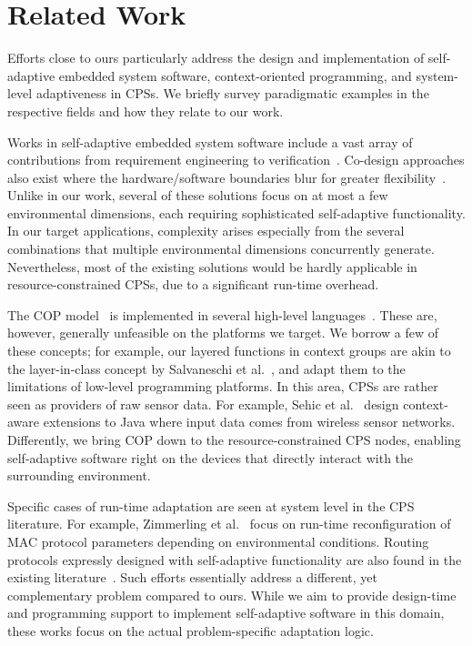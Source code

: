 \section{Related Work}
\label{sec:related}

Efforts close to ours particularly address the design and
implementation of self-adaptive embedded system software,
context-oriented programming, and system-level adaptiveness in
CPSs. We briefly survey paradigmatic examples in the respective fields
and how they relate to our work.

Works in self-adaptive embedded system software
include a vast array of contributions from requirement engineering to
verification~\cite{cheng:adaptive}. Co-design approaches also exist
where the hardware/software boundaries blur for greater
flexibility~\cite{diguet11:closed}. Unlike in our work, several of
these solutions focus on at most a few environmental dimensions, each
requiring sophisticated self-adaptive functionality. In our target
applications, complexity arises especially from the several
combinations that multiple environmental dimensions concurrently
generate. Nevertheless, most of the existing solutions would be hardly
applicable in resource-constrained CPSs, due to a significant
run-time overhead.

The COP model~\cite{Hirschfeld08} is implemented in several high-level
languages~\cite{Bardram05,Ghezzi10,Kamina11,Salvaneschi12,Sehic11}. These
are, however, generally unfeasible on the platforms we target. We
borrow a few of these concepts; for example, our layered functions in
context groups are akin to the layer-in-class concept by Salvaneschi
et al.~\cite{Salvaneschi12}, and adapt them to the limitations of
low-level programming platforms. In this area, CPSs are rather seen as
providers of raw sensor data. For example, Sehic et al.~\cite{Sehic11}
design context-aware extensions to Java where input data comes from
wireless sensor networks. Differently, we bring COP down to the
resource-constrained CPS nodes, enabling self-adaptive software right
on the devices that directly interact with the surrounding
environment.

Specific cases of run-time adaptation are seen at system level in the
CPS literature. For example, Zimmerling et al.~\cite{zimmerling12} focus
on run-time reconfiguration of MAC protocol parameters depending on
environmental conditions. Routing protocols expressly designed
with self-adaptive functionality are also found in the existing
literature~\cite{Bourdenas11}. Such efforts essentially address
a different, yet complementary problem compared to ours. While we aim
to provide design-time and programming support to implement
self-adaptive software in this domain, these works focus on the actual
problem-specific adaptation logic.

